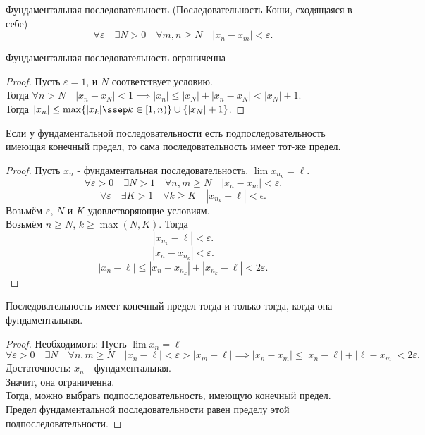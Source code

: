 \documentclass[11pt, oneside]{article}   	%
\begin{document}
    \begin{definition}
        Фундаментальная последовательность (Последовательность Коши, сходящаяся в себе) - 
        \[ \forall{\varepsilon}\quad \exists{N>0}\quad \forall{m,n\ge N}\quad |x_n-x_m|<\varepsilon .\] 
    \end{definition}
    \begin{dlemma}
        Фундаментальная последовательность ограниченна
        \begin{proof}
            Пусть $\varepsilon = 1$, и  $N$ соответствует условию.\\
            Тогда  $\forall{n>N}\quad |x_n - x_N| < 1 \implies |x_n| \le |x_N| + |x_n-x_N| < |x_N| + 1$.\\
            Тогда $|x_n| \le \max \{|x_k| \ssep k\in \left[1, n\right)\} \cup \{|x_N| + 1\}  $.
        \end{proof}
    \end{dlemma}
    \begin{dlemma}
        Если у фундаментальной последовательности есть подпоследовательность имеющая конечный предел, то сама последовательность имеет тот-же предел.\\
        \begin{proof}
            Пусть $x_n$ - фундаментальная последовательность. $\lim x_{n_k} = \ell$.
            \[ \forall{\varepsilon>0}\quad \exists{N>1}\quad \forall{n,m\ge N}\quad |x_n-x_m|<\varepsilon .\]
            \[ \forall{\varepsilon}\quad \exists{K>1}\quad \forall{k\ge K}\quad |x_{n_k}-\ell| < \epsilon .\]
            Возьмём $\varepsilon$, $N$ и $K$ удовлетворяющие условиям.\\
            Возьмём $n\ge N$, $k \ge \max\left( N, K \right) $. Тогда
            \[ |x_{n_k}-\ell| < \varepsilon .\]
            \[ |x_n-x_{n_k}| < \varepsilon .\]
            \[ |x_n-\ell| \le |x_n -x_{n_k}|+|x_{n_k}-\ell| < 2\varepsilon .\] 
        \end{proof}
    \end{dlemma}
    \begin{theorem}
        Последовательность имеет конечный предел тогда и только тогда, когда она фундаментальная.\\
        \begin{proof}
            Необходимоть:
            Пусть $\lim x_n = \ell$
             \[ \forall{\varepsilon>0}\quad \exists{N}\quad \forall{n, m\ge N}\quad |x_n-\ell| < \varepsilon > |x_m-\ell| \implies |x_n-x_m| \le |x_n-\ell|+|\ell-x_m| < 2\varepsilon .\]
            Достаточность:
            $x_n$ - фундаментальная.\\
            Значит, она ограниченна.\\
            Тогда, можно выбрать подпоследовательность, имеющую конечный предел.\\
            Предел фундаментальной последовательности равен пределу этой подпоследовательности.
        \end{proof}
    \end{theorem}
\end{document}

